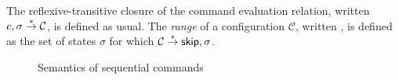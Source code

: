 \documentclass[11pt]{report}         %
\begin{document}
The reflexive-transitive closure of the command evaluation relation, written $c,\sigma \stackrel{\ast}{\rightarrow} \mathcal{C}$, is defined as usual. The \emph{range} of a configuration $\mathcal{C}$, written , is defined as the set of states $\sigma$ for which $\mathcal{C} \stackrel{\ast}{\rightarrow} \operatorname{\mathsf{skip}},\sigma$. 

\begin{figure}[ht]
    \centering

    \vspace{1em}


    \vspace{1em}


    \vspace{1em}


    \vspace{1em}


    \vspace{1em}


    \vspace{1em}


    \vspace{1em}


    \vspace{1em}


    \vspace{1em}


    \caption{\label{fig:sequential-command-semantics} Semantics of sequential commands}
\end{figure} 
 
\end{document}
